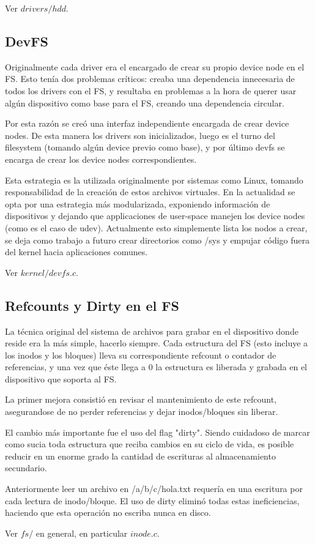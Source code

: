 Ver $drivers/hdd$.

\subsection{DevFS}

Originalmente cada driver era el encargado de crear su propio device node en el
FS. Esto tenía dos problemas críticos: creaba una dependencia innecesaria de todos
los drivers con el FS, y resultaba en problemas a la hora de querer usar algún
dispositivo como base para el FS, creando una dependencia circular.

Por esta razón se creó una interfaz independiente encargada de crear device
nodes. De esta manera los drivers son inicializados, luego es el turno del
filesystem (tomando algún device previo como base), y por último devfs se
encarga de crear los device nodes correspondientes.

Esta estrategia es la utilizada originalmente por sistemas como Linux, tomando
responsabilidad de la creación de estos archivos virtuales. En la actualidad se
opta por una estrategia más modularizada, exponiendo información de dispositivos
y dejando que applicaciones de user-space manejen los device nodes (como es el
caso de udev). Actualmente esto simplemente lista los nodos a crear, se deja como
trabajo a futuro crear directorios como /sys y empujar código fuera del kernel
hacia aplicaciones comunes.

Ver $kernel/devfs.c$.

\subsection{Refcounts y Dirty en el FS}

La técnica original del sistema de archivos para grabar en el dispositivo donde
reside era la más simple, hacerlo siempre. Cada estructura del FS (esto incluye
a los inodos y los bloques) lleva su correspondiente refcount o contador de
referencias, y una vez que éste llega a 0 la estructura es liberada y grabada en
el dispositivo que soporta al FS.

La primer mejora consistió en revisar el mantenimiento de este refcount,
asegurandose de no perder referencias y dejar inodos/bloques sin liberar.

El cambio más importante fue el uso del flag "dirty". Siendo cuidadoso de marcar como
sucia toda estructura que reciba cambios en su ciclo de vida, es posible reducir
en un enorme grado la cantidad de escrituras al almacenamiento secundario.

Anteriormente leer un archivo en /a/b/c/hola.txt requería en
una escritura por cada lectura de inodo/bloque. El uso de dirty eliminó todas
estas ineficiencias, haciendo que esta operación no escriba nunca en disco.

Ver $fs/$ en general, en particular $inode.c$.
